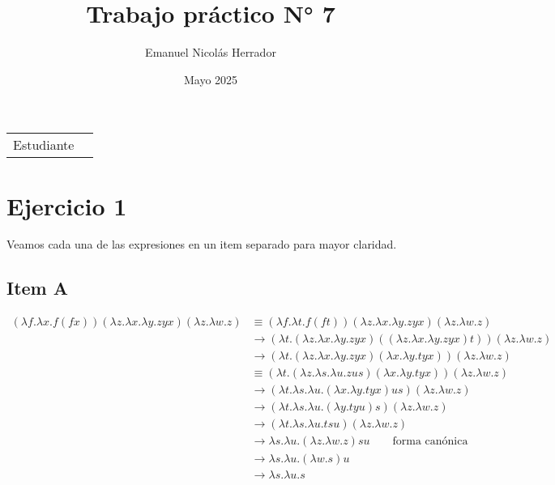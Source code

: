 \documentclass{article}
\title{Trabajo práctico N° 7}
\author{Emanuel Nicolás Herrador}
\date{Mayo 2025}
\begin{document}
\maketitle

\noindent\begin{tabular}{@{}ll}
	Estudiante & \theauthor \\
\end{tabular}

\section*{Ejercicio 1}
Veamos cada una de las expresiones en un item separado para mayor claridad.

\subsection*{Item A}
\begin{equation*}
  \begin{aligned}
    (\lambda f. \lambda x. f(fx)) (\lambda z. \lambda x. \lambda y. zyx) (\lambda z. \lambda w. z) &\equiv (\lambda f. \lambda t. f(ft))(\lambda z. \lambda x. \lambda y. zyx)(\lambda z.\lambda w. z) \\ 
                                                                                                   &\to (\lambda t. (\lambda z.\lambda x.\lambda y. zyx)((\lambda z.\lambda x.\lambda y. zyx)t))(\lambda z.\lambda w. z) \\ 
                                                                                                   &\to (\lambda t. (\lambda z.\lambda x.\lambda y. zyx)(\lambda x.\lambda y. tyx))(\lambda z.\lambda w. z) \\ 
                                                                                                   &\equiv (\lambda t. (\lambda z.\lambda s.\lambda u. zus)(\lambda x.\lambda y. tyx))(\lambda z.\lambda w. z) \\ 
                                                                                                   &\to (\lambda t.\lambda s.\lambda u. (\lambda x.\lambda y. tyx)us)(\lambda z.\lambda w. z) \\ 
                                                                                                   &\to (\lambda t.\lambda s.\lambda u. (\lambda y. tyu)s)(\lambda z.\lambda w. z) \\ 
                                                                                                   &\to (\lambda t.\lambda s.\lambda u. tsu)(\lambda z.\lambda w. z) \\ 
                                                                                                   &\to \lambda s.\lambda u. (\lambda z.\lambda w. z)su \qquad\text{forma canónica}\\
                                                                                                   &\to \lambda s.\lambda u. (\lambda w. s)u \\ 
                                                                                                   &\to \lambda s.\lambda u. s
  \end{aligned}
\end{equation*}
\end{document}
